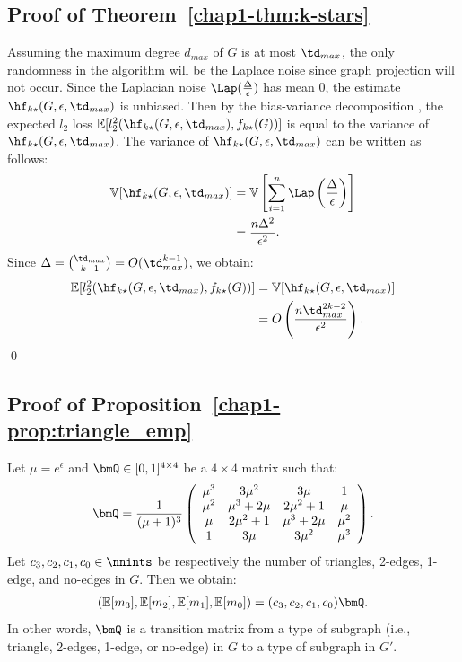 \subsection{Proof of Theorem~\ref{chap1-thm:k-stars}}
Assuming the maximum degree $d_{max}$ of $G$ is at most $\td_{max}$, the only
randomness in the algorithm will be the Laplace noise since graph projection
will not occur.
Since the Laplacian noise $\Lap(\frac{\Delta}{\epsilon})$ has mean $0$, the estimate $\hf_{k\star}(G, \epsilon, \td_{max})$ is unbiased. 
Then by the bias-variance decomposition \cite{mlpp}, 
the expected $l_2$ loss 
$\mathbb{E}[l_2^2(\hf_{k\star}(G, \epsilon, \td_{max}),\allowbreak f_{k\star}(G))]$ is equal to the variance of $\hf_{k\star}(G, \epsilon, \td_{max})$. 
The variance of $\hf_{k\star}(G, \epsilon, \td_{max})$ can be written as follows:
\begin{align*}
    \mathbb{V}[\hf_{k\star}(G, \epsilon, \td_{max})] 
    &= \mathbb{V}\left[ \sum_{i=1}^n \Lap\left( \frac{\Delta}{\epsilon} \right) \right] \\
    &= \frac{n \Delta^2}{\epsilon^2}.
\end{align*}
Since $\Delta = \binom{\td_{max}}{k-1} = O(\td_{max}^{k-1})$, we obtain:
\begin{align*}
    \mathbb{E}[l_2^2(\hf_{k\star}(G, \epsilon, \td_{max}), f_{k\star}(G))] 
    &= \mathbb{V}[\hf_{k\star}(G, \epsilon, \td_{max})] \\
    &= O\left(\frac{n \td_{max}^{2k-2}}{\epsilon^2}\right).
\end{align*}
\qed

\subsection{Proof of Proposition~\ref{chap1-prop:triangle_emp}}
Let $\mu = e^\epsilon$ and $\bmQ \in [0,1]^{4 \times 4}$ be a $4 \times 4$ matrix such that:
\begin{align}
  \bmQ = \frac{1}{(\mu+1)^3} \left(
    \begin{array}{cccc}
      \mu^3 & 3\mu^2 & 3\mu & 1 \\
      \mu^2 & \mu^3+2\mu & 2\mu^2+1 & \mu \\
      \mu & 2\mu^2+1 & \mu^3+2\mu & \mu^2 \\
      1 & 3\mu & 3\mu^2 & \mu^3
    \end{array}
  \right).
  \label{chap1-eq:Q_1}
\end{align}
Let $c_3, c_2, c_1, c_0 \in \nnints$ be respectively the number of triangles, 2-edges, 1-edge, and no-edges in $G$. 
Then we obtain:
\begin{align}
(\mathbb{E}[m_3], \mathbb{E}[m_2], \mathbb{E}[m_1],
\mathbb{E}[m_0]) = (c_3, c_2, c_1, c_0) \bmQ.
\label{chap1-eq:bmQ}
\end{align}
In other words, $\bmQ$ is a transition matrix from a type of subgraph (i.e., triangle, 2-edges, 1-edge, or no-edge) in $G$ to a type of subgraph in $G'$. 

